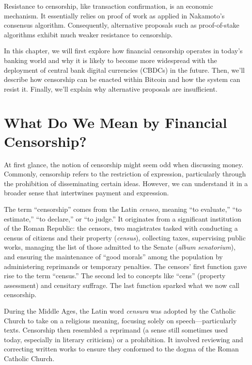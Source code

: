 \documentclass[
  a5paper,
  smalldemyvopaper,10pt,twoside,onecolumn,openright,extrafontsizes,hidelinks]{memoir}
\begin{document}
Resistance to censorship, like transaction confirmation, is an economic
mechanism. It essentially relies on proof of work as applied in
Nakamoto's consensus algorithm. Consequently, alternative proposals such
as proof-of-stake algorithms exhibit much weaker resistance to
censorship.

In this chapter, we will first explore how financial censorship operates
in today's banking world and why it is likely to become more widespread
with the deployment of central bank digital currencies (CBDCs) in the
future. Then, we'll describe how censorship can be enacted within
Bitcoin and how the system can resist it. Finally, we'll explain why
alternative proposals are insufficient.

\section*{What Do We Mean by Financial
Censorship?}\label{quentendons-nous-par-censure-financiuxe8re}


At first glance, the notion of censorship might seem odd when discussing
money. Commonly, censorship refers to the restriction of expression,
particularly through the prohibition of disseminating certain ideas.
However, we can understand it in a broader sense that intertwines
payment and expression.

The term ``censorship'' comes from the Latin \emph{censeo}, meaning ``to
evaluate,'' ``to estimate,'' ``to declare,'' or ``to judge.'' It
originates from a significant institution of the Roman Republic: the
censors, two magistrates tasked with conducting a census of citizens and
their property (\emph{census}), collecting taxes, supervising public
works, managing the list of those admitted to the Senate (\emph{album
senatorium}), and ensuring the maintenance of ``good morals'' among the
population by administering reprimands or temporary penalties. The
censors' first function gave rise to the term ``census.'' The second led
to concepts like ``cens'' (property assessment) and censitary suffrage.
The last function sparked what we now call censorship.

During the Middle Ages, the Latin word \emph{censura} was adopted by the
Catholic Church to take on a religious meaning, focusing solely on
speech---particularly texts. Censorship then resembled a reprimand (a
sense still sometimes used today, especially in literary criticism) or a
prohibition. It involved reviewing and correcting written works to
ensure they conformed to the dogma of the Roman Catholic Church.
\end{document}

